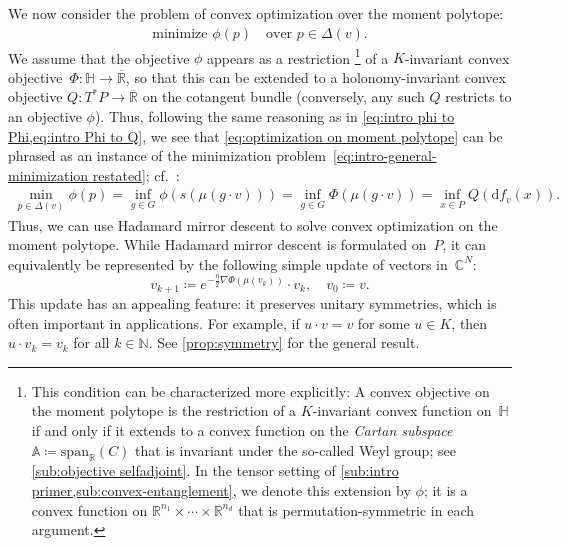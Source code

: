 \documentclass[11pt,letterpaper]{article}
\numberwithin{equation}{section}
\renewcommand{\AA}{\mathbb{A}}
\newcommand{\RR}{\mathbb{R}}
\newcommand{\CC}{\mathbb{C}}
\newcommand{\NN}{\mathbb{N}}
\newcommand{\bbH}{\mathbb{H}}
\newcommand{\diff}{\mathrm{d}}
\newcommand{\minproblem}[2]{\text{minimize } #1 \quad \text{over } #2}
\begin{document}
We now consider the problem of convex optimization over the moment polytope:
\begin{align}\label{eq:optimization on moment polytope}
    \minproblem{\phi(p)}{p \in \Delta(v)}.
\end{align}
We assume that the objective $\phi$ appears as a restriction%
\footnote{This condition can be characterized more explicitly:
A convex objective on the moment polytope is the restriction of a $K$-invariant convex function on~$\bbH$ if and only if it extends to a convex function on the \emph{Cartan subspace}~$\AA \coloneqq \mathrm{span}_{\RR}(C)$ that is invariant under the so-called Weyl group; see \cref{sub:objective selfadjoint}.
In the tensor setting of \cref{sub:intro primer,sub:convex-entanglement}, we denote this extension by $\phi$; it is a convex function on $\RR^{n_1}\times\cdots\times\RR^{n_d}$ that is permutation-symmetric in each argument.}
of a $K$-invariant convex objective~$\Phi \colon \bbH \to \overline{\RR}$, so that this can be extended to a holonomy-invariant convex objective $Q \colon T^*P \to \overline{\RR}$ on the cotangent bundle (conversely, any such $Q$ restricts to an objective $\phi$).
Thus, following the same reasoning as in \cref{eq:intro phi to Phi,eq:intro Phi to Q}, we see that \cref{eq:optimization on moment polytope} can be phrased as an instance of the minimization problem~\eqref{eq:intro-general-minimization restated}; cf.~\cite{Hirai2025}:
\begin{align*}
    \min_{p \in \Delta(v)} \phi(p)
= \inf_{g \in G} \phi(s(\mu(g \cdot v)))
= \inf_{g \in G} \Phi(\mu(g \cdot v))
= \inf_{x \in P} Q(\diff f_v(x)).
\end{align*}
Thus, we can use Hadamard mirror descent to solve convex optimization on the moment polytope.
While Hadamard mirror descent is formulated on~$P$, it can equivalently be represented by the following simple update of vectors in~$\CC^N$:
\begin{equation}\label{eq:intro iteration}
    v_{k+1} \coloneqq e^{-\frac\eta2\nabla\Phi(\mu(v_k))}\cdot v_k, \quad v_0 \coloneqq v.
\end{equation}
This update has an appealing feature: it preserves unitary symmetries, which is often important in applications.
For example, if $u \cdot v = v$ for some $u \in K$, then $u \cdot v_k = v_k$ for all $k\in\NN$.
See \cref{prop:symmetry} for the general result.
\end{document}
